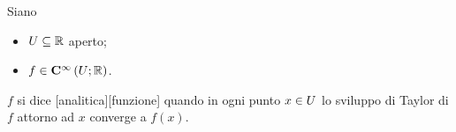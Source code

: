 \begin{Definition}
  Siano
  \begin{itemize}
    \item $U \subseteq \mathbb{R}$ aperto;
    \item $f \in \CClass{\infty}[\Open][\mathbb{R}]$.
  \end{itemize}
  $f$ si dice
  [analitica][funzione]
  quando in ogni punto $x \in U$ lo sviluppo di Taylor di $f$ attorno ad
  $x$ converge a $f(x)$.
\end{Definition}
